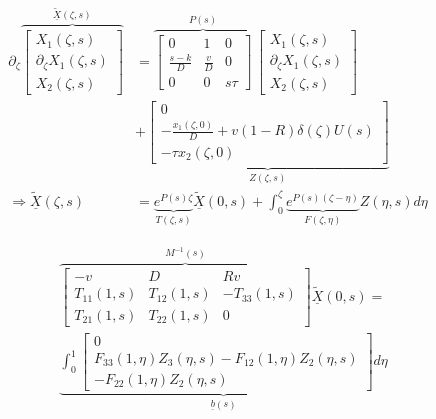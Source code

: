 \begin{equation} \label{eq:laplace_transformed}
    \begin{aligned}
        \partial_\zeta \overbrace{\begin{bmatrix}
            X_1(\zeta,s)\\ \partial_\zeta X_1(\zeta,s)\\ X_2(\zeta,s)
        \end{bmatrix}}^{\underline{\tilde{X}}(\zeta,s)} &= \overbrace{\begin{bmatrix}
            0 & 1 & 0\\
            \frac{s-k}{D} & \frac{v}{D} & 0\\
            0 & 0 & s\tau
            \end{bmatrix}}^{P(s)} \, \begin{bmatrix}
                X_1(\zeta,s)\\ \partial_\zeta X_1(\zeta,s)\\ X_2(\zeta,s)
            \end{bmatrix} \\
            &+ \underbrace{\begin{bmatrix}
                0\\ -\frac{x_1(\zeta,0)}{D} + v(1-R) \delta(\zeta) U(s)\\ -\tau x_2(\zeta,0)
            \end{bmatrix}}_{Z(\zeta,s)} \\
            \Rightarrow \underline{\tilde{X}}(\zeta,s) &= \underbrace{e^{P(s)\zeta}}_{T(\zeta,s)} \underline{\tilde{X}}(0,s) + \int_0^\zeta \underbrace{e^{P(s)(\zeta - \eta)}}_{F(\zeta, \eta)} Z(\eta,s) d\eta
    \end{aligned}
\end{equation}

\begin{equation} \label{eq:BC_AE}
\begin{aligned}
        &\overbrace{\begin{bmatrix}
            -v & D & Rv\\
            T_{11}(1,s) & T_{12}(1,s) & -T_{33}(1,s)\\
            T_{21}(1,s) & T_{22}(1,s) & 0
        \end{bmatrix}}^{M^{-1}(s)} \underline{\tilde{X}}(0,s) =\\ 
        &\underbrace{\int_0^1 \begin{bmatrix}
            0\\ F_{33}(1, \eta) Z_3(\eta,s) - F_{12}(1, \eta) Z_2(\eta,s)\\ -F_{22}(1, \eta) Z_2(\eta,s)
        \end{bmatrix} d\eta}_{\underline{b}(s)} \\
\end{aligned}
\end{equation}

